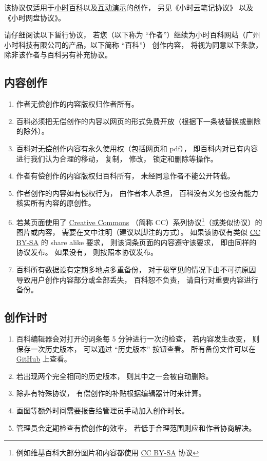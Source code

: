 
该协议仅适用于\href{http://wuli.wiki/online/}{小时百科}以及\href{http://wuli.wiki/apps/}{互动演示}的创作， 另见《小时云笔记协议》 以及《小时网盘协议》。

请仔细阅读以下暂行协议， 若您（以下称为 “作者”）继续为小时百科网站（广州小时科技有限公司的产品，以下简称 “百科”） 创作内容， 将视为同意以下条款， 除非该作者与百科另有补充协议。

\subsection{内容创作}
\begin{enumerate}
\item 作者无偿创作的内容版权归作者所有。
\item 百科必须把无偿创作的内容以网页的形式免费开放（根据下一条被替换或删除的除外）。
\item 百科对无偿创作内容有永久使用权（包括网页和 pdf）， 即百科内对已有内容进行我们认为合理的移动， 复制， 修改， 锁定和删除等操作。
\item 作者有偿创作的内容版权归百科所有， 未经同意作者不能公开转载。
\item 作者创作的内容如有侵权行为， 由作者本人承担， 百科没有义务也没有能力核实所有内容的原创性。
\item 若某页面使用了 \href{https://creativecommons.org/licenses/}{Creative Commons} （简称 CC）系列协议\footnote{例如维基百科大部分图片和内容都使用 \href{https://creativecommons.org/licenses/by-sa/3.0/}{CC BY-SA} 协议}（或类似协议）的图片或内容， 需要在文中注明（建议以脚注的方式）。 如果该协议有类似 \href{https://creativecommons.org/licenses/by-sa/3.0/}{CC BY-SA} 的 share alike 要求， 则该词条页面的内容遵守该要求， 即由同样的协议发布。 如果没有， 则按照本协议发布。
\item 百科所有数据设有定期多地点多重备份， 对于极罕见的情况下由不可抗原因导致用户创作内容部分或全部丢失， 百科恕不负责， 请自行对重要内容进行备份。
\end{enumerate}

\subsection{创作计时}
\begin{enumerate}
\item 百科编辑器会对打开的词条每 5 分钟进行一次的检查， 若内容发生改变， 则保存一次历史版本， 可以通过 “历史版本” 按钮查看。 所有备份文件可以在 \href{https://github.com/MacroUniverse/PhysWiki-backup}{GitHub} 上查看。
\item 若出现两个完全相同的历史版本， 则其中之一会被自动删除。
\item 除非有特殊协议， 有偿创作的补贴根据编辑器计时来计算。
\item 画图等额外时间需要报告给管理员手动加入创作时长。
\item 管理员会定期检查有偿创作的效率， 若低于合理范围则应和作者协商解决。
\end{enumerate}

